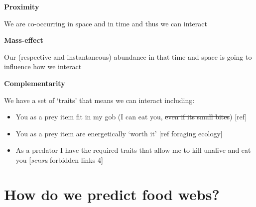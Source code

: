 \documentclass[
]{article}
\providecommand{\tightlist}{%
  \setlength{\itemsep}{0pt}\setlength{\parskip}{0pt}}\usepackage{longtable,booktabs,array}
\begin{document}
\begin{tcolorbox}[enhanced jigsaw, title=\textcolor{quarto-callout-note-color}{\faInfo}\hspace{0.5em}{Box 1 - Mechanisms that determine feeding links}, arc=.35mm, rightrule=.15mm, coltitle=black, colframe=quarto-callout-note-color-frame, bottomrule=.15mm, opacityback=0, opacitybacktitle=0.6, bottomtitle=1mm, colback=white, colbacktitle=quarto-callout-note-color!10!white, titlerule=0mm, breakable, left=2mm, leftrule=.75mm, toptitle=1mm, toprule=.15mm]

\textbf{Proximity}

We are co-occurring in space and in time and thus we can interact

\textbf{Mass-effect}

Our (respective and instantaneous) abundance in that time and space is
going to influence how we interact

\textbf{Complementarity}

We have a set of `traits' that means we can interact including:

\begin{itemize}
\tightlist
\item
  You as a prey item fit in my gob (I can eat you, \st{even if its small
  bites}) {[}ref{]}
\item
  You as a prey item are energetically `worth it' {[}ref foraging
  ecology{]}
\item
  As a predator I have the required traits that allow me to \st{kill}
  unalive and eat you {[}\emph{sensu} forbidden links 4{]}
\end{itemize}

\end{tcolorbox}

\section{How do we predict food webs?}\label{sec-network-build}
\end{document}
